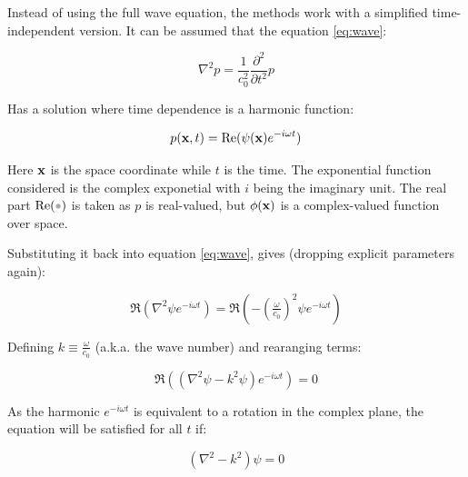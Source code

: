 Instead of using the full wave equation, the methods work with a simplified
time-independent version. It can be assumed that the equation
\ref{eq:wave}:

\[ \nabla^2 p = \frac{1}{c^2_0}\frac{\partial^2}{\partial t^2} p \]

Has a solution where time dependence is a harmonic function:

\begin{equation}
\label{eq:pressurepsi}
p(\mathrm{\mathbf{x}},t) = \operatorname{Re}(\psi(\mathrm{\mathbf{x}})e^{-i\omega t})
\end{equation}

Here $\mathrm{\mathbf{x}}$ is the space coordinate while $t$ is the time. The exponential
function considered is the complex exponetial with $i$ being the imaginary unit.
The real part $\Re(\parm)$ is taken as $p$ is real-valued, but $\phi(\mathrm{\mathbf{x}})$
is a complex-valued function over space.

Substituting it back into equation \ref{eq:wave}, gives
(dropping explicit parameters again):

\[ \Re(\nabla^2 \psi e^{-i\omega t}) =
\Re(-(\tfrac{\omega}{c_0})^2 \psi e^{-i\omega t})\]


Defining $k \equiv \tfrac{\omega}{c_0} $ (a.k.a. the wave number) and rearanging
terms:

\[ \Re((\nabla^2 \psi -k^2 \psi) e^{-i\omega t}) = 0\]

As the harmonic $e^{-i\omega t}$ is equivalent to a rotation in the complex
plane, the equation will be satisfied for all $t$ if:

\begin{equation}
\label{eq:helmholtz}
(\nabla^2 -k^2)\psi = 0 
\end{equation}

% 
% 
% 
% 
% 
% 

